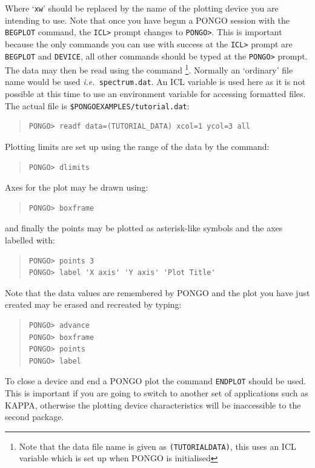 \documentclass[twoside,11pt]{article}
\newcommand{\htmlref}[2]{#1}
\newcommand{\xref}[3]{#1}
\renewcommand{\_}{\texttt{\symbol{95}}}
\newcommand{\ie}{{\em i.e.\ }}
\newcommand{\cnam}[1]{{\tt #1}}
\newcommand{\iref} [1]{\htmlref{#1}{#1}}
\begin{document}
Where `\verb+xw+' should be replaced by the name of the plotting device you
are intending to use.  Note that once you have begun a PONGO session
with the \cnam{\iref{BEGPLOT}} command, the \verb+ICL>+ prompt changes
to \verb+PONGO>+. This is important because the only commands you can
use with success at the \verb+ICL>+ prompt are \cnam{\iref{BEGPLOT}}
and \cnam{\iref{DEVICE}}, all other commands should be typed at the
\verb+PONGO>+ prompt. The data may then be read using the
command \footnote{Note that the data file name is given as
\texttt{(TUTORIAL\_DATA)}, this uses an ICL variable which is set up
when PONGO is initialised}. Normally an `ordinary' file name would be
used \ie \texttt{spectrum.dat}. An ICL variable is used here as it is
not possible at this time to use an environment variable for accessing
formatted files. The actual file is
\texttt{\$PONGO\_EXAMPLES/tutorial.dat}:

\begin{quote}
\begin{verbatim}
PONGO> readf data=(TUTORIAL_DATA) xcol=1 ycol=3 all
\end{verbatim}
\end{quote}
Plotting limits are set up using the range of the data by the command:
\begin{quote}
\begin{verbatim}
PONGO> dlimits
\end{verbatim}
\end{quote}
Axes for the plot may be drawn using:
\begin{quote}
\begin{verbatim}
PONGO> boxframe
\end{verbatim}
\end{quote}
and finally the points may be plotted as asterisk-like symbols and the axes
labelled with:
\begin{quote}
\begin{verbatim}
PONGO> points 3
PONGO> label 'X axis' 'Y axis' 'Plot Title'
\end{verbatim}
\end{quote}
Note that the data values are remembered by PONGO and the plot you have
just created may be erased and recreated by typing:
\begin{quote}
\begin{verbatim}
PONGO> advance
PONGO> boxframe
PONGO> points
PONGO> label
\end{verbatim}
\end{quote}
To close a device and end a PONGO plot the command
\cnam{\iref{ENDPLOT}} should be used.  This is important if you are
going to switch to another set of applications such as
\xref{KAPPA}{sun95}{}, otherwise the plotting device characteristics
will be inaccessible to the second package.
\end{document}
